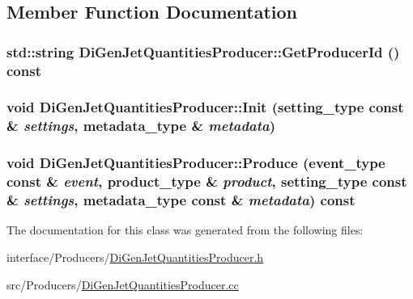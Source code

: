 \subsection{Member Function Documentation}
\hypertarget{classDiGenJetQuantitiesProducer_a1c194c368d6c1c2d10dc839d0187437c}{
\subsubsection[{GetProducerId}]{\setlength{\rightskip}{0pt plus 5cm}std::string DiGenJetQuantitiesProducer::GetProducerId () const}}
\label{classDiGenJetQuantitiesProducer_a1c194c368d6c1c2d10dc839d0187437c}
\hypertarget{classDiGenJetQuantitiesProducer_a48099052687ad6a6eefab97bd41ba632}{
\subsubsection[{Init}]{\setlength{\rightskip}{0pt plus 5cm}void DiGenJetQuantitiesProducer::Init (setting\_\-type const \& {\em settings}, \/  metadata\_\-type \& {\em metadata})}}
\label{classDiGenJetQuantitiesProducer_a48099052687ad6a6eefab97bd41ba632}
\hypertarget{classDiGenJetQuantitiesProducer_a29e429278cf2b72ebae47f8632b9e32b}{
\subsubsection[{Produce}]{\setlength{\rightskip}{0pt plus 5cm}void DiGenJetQuantitiesProducer::Produce (event\_\-type const \& {\em event}, \/  product\_\-type \& {\em product}, \/  setting\_\-type const \& {\em settings}, \/  metadata\_\-type const \& {\em metadata}) const}}
\label{classDiGenJetQuantitiesProducer_a29e429278cf2b72ebae47f8632b9e32b}


The documentation for this class was generated from the following files:\begin{DoxyCompactItemize}
\item 
interface/Producers/\hyperlink{DiGenJetQuantitiesProducer_8h}{DiGenJetQuantitiesProducer.h}\item 
src/Producers/\hyperlink{DiGenJetQuantitiesProducer_8cc}{DiGenJetQuantitiesProducer.cc}\end{DoxyCompactItemize}
